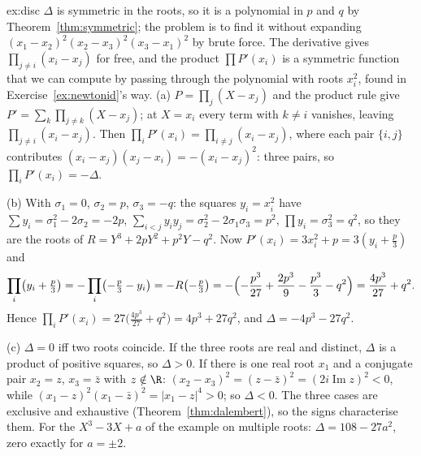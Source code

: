 \begin{solution}{ex:disc}
\idea $\Delta$ is symmetric in the roots, so it is a polynomial in $p$ and $q$ by Theorem~\ref{thm:symmetric}; the problem is to find it without expanding $(x_1-x_2)^2(x_2-x_3)^2(x_3-x_1)^2$ by brute force. The derivative gives $\prod_{j\ne i}(x_i-x_j)$ for free, and the product $\prod P'(x_i)$ is a symmetric function that we can compute by passing through the polynomial with roots $x_i^2$, found in Exercise~\ref{ex:newtonid}'s way.
\writeup (a) $P=\prod_j(X-x_j)$ and the product rule give $P'=\sum_k\prod_{j\ne k}(X-x_j)$; at $X=x_i$ every term with $k\ne i$ vanishes, leaving $\prod_{j\ne i}(x_i-x_j)$. Then $\prod_iP'(x_i)=\prod_{i\ne j}(x_i-x_j)$, where each pair $\{i,j\}$ contributes $(x_i-x_j)(x_j-x_i)=-(x_i-x_j)^2$: three pairs, so $\prod_iP'(x_i)=-\Delta$.

(b) With $\sigma_1=0$, $\sigma_2=p$, $\sigma_3=-q$: the squares $y_i=x_i^2$ have $\sum y_i=\sigma_1^2-2\sigma_2=-2p$, $\sum_{i<j}y_iy_j=\sigma_2^2-2\sigma_1\sigma_3=p^2$, $\prod y_i=\sigma_3^2=q^2$, so they are the roots of $R=Y^3+2pY^2+p^2Y-q^2$. Now $P'(x_i)=3x_i^2+p=3(y_i+\frac p3)$ and
\[
\prod_i\bigl(y_i+\tfrac p3\bigr)=-\prod_i\bigl(-\tfrac p3-y_i\bigr)=-R\bigl(-\tfrac p3\bigr)=-\Bigl(-\frac{p^3}{27}+\frac{2p^3}9-\frac{p^3}3-q^2\Bigr)=\frac{4p^3}{27}+q^2.
\]
Hence $\prod_iP'(x_i)=27\bigl(\frac{4p^3}{27}+q^2\bigr)=4p^3+27q^2$, and $\Delta=-4p^3-27q^2$.

(c) $\Delta=0$ iff two roots coincide. If the three roots are real and distinct, $\Delta$ is a product of positive squares, so $\Delta>0$. If there is one real root $x_1$ and a conjugate pair $x_2=z$, $x_3=\bar z$ with $z\notin\R$: $(x_2-x_3)^2=(z-\bar z)^2=(2i\operatorname{Im}z)^2<0$, while $(x_1-z)^2(x_1-\bar z)^2=|x_1-z|^4>0$; so $\Delta<0$. The three cases are exclusive and exhaustive (Theorem~\ref{thm:dalembert}), so the signs characterise them. For the $X^3-3X+a$ of the example on multiple roots: $\Delta=108-27a^2$, zero exactly for $a=\pm2$.
\end{solution}

